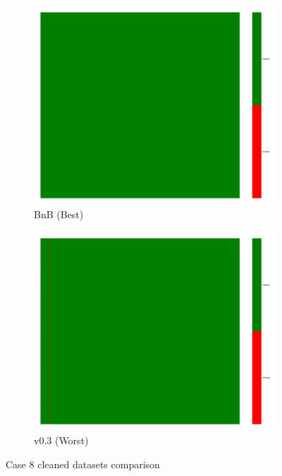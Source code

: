 \documentclass[a4paper,12pt]{article}
\begin{document}
\begin{figure}[H]
    \centering
    \begin{subfigure}{0.45\textwidth}
        \includegraphics[width=\linewidth]{case9_bnb_heatmap_cleaned.png}
        \caption{BnB (Best)}
    \end{subfigure}
    \hfill
    \begin{subfigure}{0.45\textwidth}
        \includegraphics[width=\linewidth]{case9_v0.3_heatmap_cleaned.png}
        \caption{v0.3 (Worst)}
    \end{subfigure}
    \caption{Case 8 cleaned datasets comparison}
\end{figure}
\end{document}
